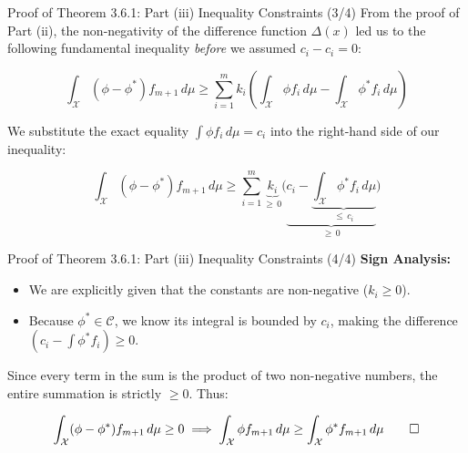 \documentclass[10pt, aspectratio=169, xcolor=dvipsnames]{beamer}
\newcommand{\lead}[1]{{\color{UniBlue}\bfseries #1}}
\begin{document}
\begin{frame}{Proof of Theorem 3.6.1: Part (iii) Inequality Constraints (3/4)}
    From the proof of Part (ii), the non-negativity of the difference function $\Delta(x)$ led us to the following fundamental inequality \textit{before} we assumed $c_i - c_i = 0$:
    
    \vspace{0.1cm}
    \[ 
        \int_{\mathcal{X}} (\phi - \phi^*) f_{m+1} \, d\mu \ge \sum_{i=1}^m k_i \left( \int_{\mathcal{X}} \phi f_i \, d\mu - \int_{\mathcal{X}} \phi^* f_i \, d\mu \right)
    \]
    
    \vspace{0.3cm}
    We substitute the exact equality $\int \phi f_i \, d\mu = c_i$ into the right-hand side of our inequality:
    
    \vspace{0.1cm}
    \[
        \int_{\mathcal{X}} (\phi - \phi^*) f_{m+1} \, d\mu \ge \sum_{i=1}^m \underbrace{k_i}_{\ge \, 0} \Biggl( \underbrace{ c_i - \underbrace{\int_{\mathcal{X}} \phi^* f_i \, d\mu}_{\le \, c_i} }_{\ge \, 0} \Biggr)
    \]
\end{frame}

\begin{frame}{Proof of Theorem 3.6.1: Part (iii) Inequality Constraints (4/4)}
    \lead{Sign Analysis:}\\
    \vspace{0.2cm}
    \begin{itemize}
        \item We are explicitly given that the constants are non-negative ($k_i \ge 0$).
        \vspace{0.3cm}
        \item Because $\phi^* \in \mathcal{C}$, we know its integral is bounded by $c_i$, making the difference $(c_i - \int \phi^* f_i) \ge 0$.
    \end{itemize}
    
    \vspace{0.6cm}
    Since every term in the sum is the product of two non-negative numbers, the entire summation is strictly $\ge 0$. Thus:
    
    \vspace{0.2cm}
    \[
        \int_{\mathcal{X}} (\phi - \phi^*) f_{m+1} \, d\mu \ge 0 \implies \int_{\mathcal{X}} \phi f_{m+1} \, d\mu \ge \int_{\mathcal{X}} \phi^* f_{m+1} \, d\mu \qed
    \]
\end{frame}
\end{document}
